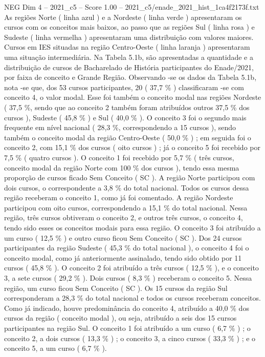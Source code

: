 \begin{textsample}{NEG Dim 4 – 2021\_c5 – Score 1.00 – 2021\_c5/enade\_2021\_hist\_1ca4f2173f.txt}
As regiões Norte ( linha azul ) e a Nordeste ( linha verde ) apresentaram os cursos com os conceitos mais baixos, ao passo que as regiões Sul ( linha rosa ) e Sudeste ( linha vermelha ) apresentaram uma distribuição com valores maiores.
Cursos em IES situadas na região Centro-Oeste ( linha laranja ) apresentaram uma situação intermediária.
Na Tabela 5.1b, são apresentadas a quantidade e a distribuição de cursos de Bacharelado de História participantes do Enade/2021, por faixa de conceito e Grande Região.
Observando -se os dados da Tabela 5.1b, nota -se que, dos 53 cursos participantes, 20 ( 37,7 \% ) classificaram -se com conceito 4, o valor modal.
Esse foi também o conceito modal nas regiões Nordeste ( 37,5 \%, sendo que ao conceito 2 também foram atribuídos outros 37,5 \% dos cursos ), Sudeste ( 45,8 \% ) e Sul ( 40,0 \% ).
O conceito 3 foi o segundo mais frequente em nível nacional ( 28,3 \%, correspondendo a 15 cursos ), sendo também o conceito modal da região Centro-Oeste ( 50,0 \% ) ; em seguida foi o conceito 2, com 15,1 \% dos cursos ( oito cursos ) ; já o conceito 5 foi recebido por 7,5 \% ( quatro cursos ).
O conceito 1 foi recebido por 5,7 \% ( três cursos, conceito modal da região Norte com 100 \% dos cursos ), tendo essa mesma proporção de cursos ficado Sem Conceito ( SC ).
A região Norte participou com dois cursos, o correspondente a 3,8 \% do total nacional.
Todos os cursos dessa região receberam o conceito 1, como já foi comentado.
A região Nordeste participou com oito cursos, correspondendo a 15,1 \% do total nacional.
Nessa região, três cursos obtiveram o conceito 2, e outros três cursos, o conceito 4, tendo sido esses os conceitos modais para essa região.
O conceito 3 foi atribuído a um curso ( 12,5 \% ) e outro curso ficou Sem Conceito ( SC ).
Dos 24 cursos participantes da região Sudeste ( 45,3 \% do total nacional ), o conceito 4 foi o conceito modal, como já anteriormente assinalado, tendo sido obtido por 11 cursos ( 45,8 \% ).
O conceito 2 foi atribuído a três cursos ( 12,5 \% ), e o conceito 3, a sete cursos ( 29,2 \% ).
Dois cursos ( 8,3 \% ) receberam o conceito 5.
Nessa região, um curso ficou Sem Conceito ( SC ).
Os 15 cursos da região Sul corresponderam a 28,3 \% do total nacional e todos os cursos receberam conceitos.
Como já indicado, houve predominância do conceito 4, atribuído a 40,0 \% dos cursos da região ( conceito modal ), ou seja, atribuído a seis dos 15 cursos participantes na região Sul.
O conceito 1 foi atribuído a um curso ( 6,7 \% ) ; o conceito 2, a dois cursos ( 13,3 \% ) ; o conceito 3, a cinco cursos ( 33,3 \% ) ; e o conceito 5, a um curso ( 6,7 \% ).

\end{textsample}

